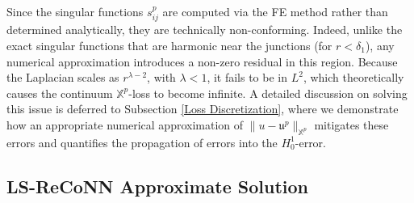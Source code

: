\documentclass[oneside]{article}
\begin{document}
\noindent Since the singular functions $s_{ij}^p$ are computed via the FE method rather than determined analytically, they are technically non-conforming. Indeed, unlike the exact singular functions that are harmonic near the junctions (for $r < \delta_1$), any numerical approximation introduces a non-zero residual in this region. Because the Laplacian scales as $r^{\lambda-2}$, with $\lambda<1$, it fails to be in $L^2$, which theoretically causes the continuum $\mathbb{X}^p$-loss to become infinite. A detailed discussion on solving this issue is deferred to Subsection \ref{Loss Discretization}, where we demonstrate how an appropriate numerical approximation of $\|u - \mathfrak{u}^p\|_{\mathbb{X}^p}$ mitigates these errors and quantifies the propagation of errors into the $H^1_0$-error.





















\subsection{LS-ReCoNN Approximate Solution}\label{LS-ReCoNN Approximate Solution}
\end{document}
